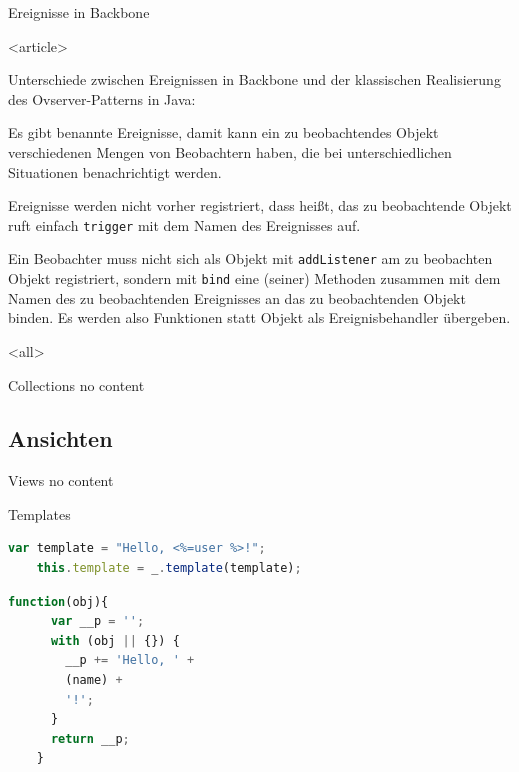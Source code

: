 \begin{Frame}[fragile]{Ereignisse in Backbone}
  \begin{center}
    
  \end{center}
\end{Frame}

\mode
<article>

Unterschiede zwischen Ereignissen in Backbone und der klassischen Realisierung
des Ovserver-Patterns in Java:
\begin{compactitem}
  \item Es gibt benannte Ereignisse, damit kann ein zu beobachtendes Objekt
    verschiedenen Mengen von Beobachtern haben, die bei unterschiedlichen
    Situationen benachrichtigt werden.
  \item Ereignisse werden nicht vorher registriert, dass heißt, das zu beobachtende
    Objekt ruft einfach \lstinline-trigger- mit dem Namen des Ereignisses auf.
  \item Ein Beobachter muss nicht sich als Objekt mit \lstinline-addListener-
    am zu beobachten Objekt registriert, sondern mit \lstinline-bind-
    eine (seiner) Methoden zusammen mit dem Namen des zu beobachtenden
    Ereignisses an das zu beobachtenden Objekt binden. Es werden also
    Funktionen statt Objekt als Ereignisbehandler übergeben.
\end{compactitem}

\mode
<all>

\begin{frame}{Collections}
  no content
\end{frame}

\subsection{Ansichten}

\begin{frame}{Views}
  no content
\end{frame}

\begin{frame}[fragile]{Templates}
  \begin{lstlisting}[language=JavaScript,gobble=4]
    var template = "Hello, <%=user %>!";
    this.template = _.template(template);
  \end{lstlisting}
  
  \begin{lstlisting}[language=JavaScript,gobble=4]
    function(obj){
      var __p = '';
      with (obj || {}) {
        __p += 'Hello, ' +
        (name) +
        '!';
      }
      return __p;
    }
  \end{lstlisting}
\end{frame}

